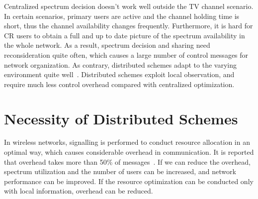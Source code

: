Centralized spectrum decision doesn't work well outside the TV channel scenario.
In certain scenarios, primary users are active and the channel holding time is short, thus the channel availability changes frequently.
Furthermore, it is hard for CR users to obtain a full and up to date picture of the spectrum availability in the whole network.
As a result, spectrum decision and sharing need reconsideration quite often, which causes a large number of control messages for network organization.
As contrary, distributed schemes adapt to the varying environment quite well~\cite{Selforganization_CRN_13}.
Distributed schemes exploit local observation, and require much less control overhead compared with centralized optimization.







\section{Necessity of Distributed Schemes}
In wireless networks, signalling is performed to conduct resource allocation in an optimal way, which causes considerable overhead in communication.
It is reported that overhead takes more than 50\% of messages~\cite{Han:2008:RAW:1457343}.
If we can reduce the overhead, spectrum utilization and the number of users can be increased, and network performance can be improved.
If the resource optimization can be conducted only with local information, overhead can be reduced.

